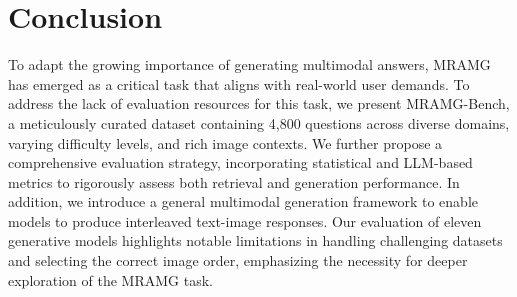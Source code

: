 \section{Conclusion}
\label{sec:conclusion}
To adapt the growing importance of generating multimodal answers, MRAMG has emerged as a critical task that aligns with real-world user demands.
To address the lack of evaluation resources for this task, we present MRAMG-Bench, a meticulously curated dataset containing 4,800 questions across diverse domains, varying difficulty levels, and rich image contexts. We further propose a comprehensive evaluation strategy, incorporating statistical and LLM-based metrics to rigorously assess both retrieval and generation performance. In addition, we introduce a general multimodal generation framework to enable models to produce interleaved text-image responses. Our evaluation of eleven generative models highlights notable limitations in handling challenging datasets and selecting the correct image order, emphasizing the necessity for deeper exploration of the MRAMG task.



